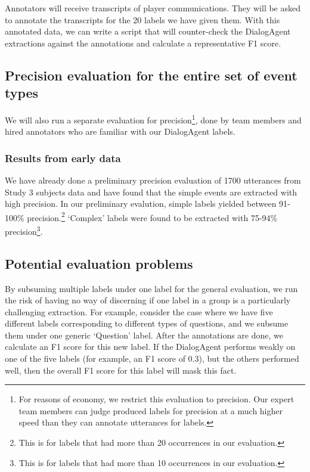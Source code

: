 Annotators will receive transcripts of player communications. They will be
asked to annotate the transcripts for the 20 labels we have given them. With
this annotated data, we can write a script that will counter-check the
DialogAgent extractions against the annotations and calculate a representative
F1 score.

\subsection{Precision evaluation for the entire set of event types}

We will also run a separate evaluation for precision\footnote{For reasons of
economy, we restrict this evaluation to precision. Our expert team members can
judge produced labels for precision at a much higher speed than they can
annotate utterances for labels.}, done by team members and hired annotators who
are familiar with our DialogAgent labels.


\subsubsection{Results from early data}

We have already done a preliminary precision evaluation of 1700 utterances from
Study 3 subjects data and have found that the simple events are extracted with
high precision.  In our preliminary evalution, simple labels yielded between
91-100\% precision.\footnote{This is for labels that had more than 20
occurrences in our evaluation.} `Complex' labels were found to be extracted
with 75-94\% precision\footnote{This is for labels that had more than 10
occurrences in our evaluation.}.

\subsection{Potential evaluation problems}

By subsuming multiple labels under one label for the general evaluation, we run
the risk of having no way of discerning if one label in a group is a
particularly challenging extraction. For example, consider the case where we
have five different labels corresponding to different types of questions, and
we subsume them under one generic `Question' label. After the annotations are
done, we calculate an F1 score for this new label. If the DialogAgent performs
weakly on one of the five labels (for example, an F1 score of 0.3), but the
others performed well, then the overall F1 score for this label will mask this
fact.

